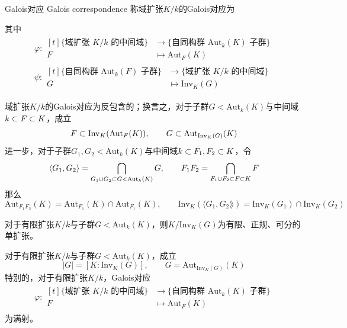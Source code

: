 \begin{definition}{Galois对应 Galois correspondence}
	称域扩张$K/k$的Galois对应为
	\begin{center}
	\end{center}
	其中
	\begin{align*}
		\varphi:\begin{aligned}[t]
			\{ \text{域扩张 }K/k\text{ 的中间域} \} &\longrightarrow \{ \text{自同构群 }\text{Aut}_k(K)\text{ 子群} \}\\
			F &\longmapsto \text{Aut}_F(K)
		\end{aligned}\\
		\psi:\begin{aligned}[t]
			\{ \text{自同构群 }\text{Aut}_k(F)\text{ 子群} \} &\longrightarrow \{ \text{域扩张 }K/k\text{ 的中间域} \}\\
			G &\longmapsto \text{Inv}_K(G)
		\end{aligned}
	\end{align*}
\end{definition}

\begin{lemma}
	域扩张$K/k$的Galois对应为反包含的；换言之，对于子群$G<\text{Aut}_k(K)$与中间域$k\subset F \subset K$，成立%
	$$
	F\subset \text{Inv}_K(\text{Aut}_F(K)),\qquad 
	G\subset \text{Aut}_{\text{Inv}_K(G)}(K)
	$$
	进一步，对于子群$G_1,G_2<\text{Aut}_k(K)$与中间域$k\subset F_1,F_2 \subset K$，令%
	$$
	\langle G_1,G_2\rangle=\bigcap_{G_1\cup G_2\subset G<\text{Aut}_k(K)}G,\qquad 
	F_1F_2=\bigcap_{F_1\cup F_2\subset F\subset K}F
	$$
	那么%
	$$
	\text{Aut}_{F_1F_2}(K)=\text{Aut}_{F_1}(K)\cap \text{Aut}_{F_1}(K),\qquad 
	\text{Inv}_K(\langle G_1,G_2\rang)=\text{Inv}_K(G_1)\cap \text{Inv}_K(G_2)
	$$
\end{lemma}

\begin{lemma}
	对于有限扩张$K/k$与子群$G<\text{Aut}_k(K)$，则$K/\text{Inv}_K(G)$为有限、正规、可分的单扩张。
\end{lemma}

\begin{proposition}
	对于有限扩张$K/k$与子群$G<\text{Aut}_k(K)$，成立%
	$$
	|G|=[K:\text{Inv}_K(G)],\qquad 
	G=\text{Aut}_{\text{Inv}_K(G)}(K)
	$$
	特别的，对于有限扩张$K/k$，Galois对应
	\begin{align*}
		\varphi:\begin{aligned}[t]
			\{ \text{域扩张 }K/k\text{ 的中间域} \} &\longrightarrow \{ \text{自同构群 }\text{Aut}_k(K)\text{ 子群} \}\\
			F &\longmapsto \text{Aut}_F(K)
		\end{aligned}
	\end{align*}
	为满射。
\end{proposition}

